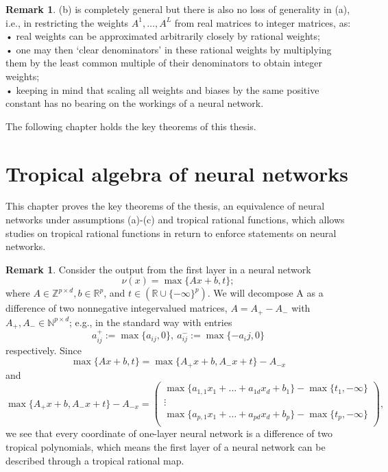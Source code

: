 \documentclass{article}
\theoremstyle{definition}
\newtheorem{remark}[theorem]{Remark}
\begin{document}
\begin{remark}\cite{zhang2018tropical}
(b) is completely general but there is also no loss of generality in (a), i.e., in restricting the weights $A^{1}, \dots ,A^{L}$
from real matrices to integer matrices, as: \\
• real weights can be approximated arbitrarily closely by
rational weights; \\
• one may then ‘clear denominators’ in these rational
weights by multiplying them by the least common multiple of their denominators to obtain integer weights; \\
• keeping in mind that scaling all weights and biases
by the same positive constant has no bearing on the
workings of a neural network.
\end{remark}

The following chapter holds the key theorems of this thesis.

\newpage

\section{Tropical algebra of neural networks}\label{sec:trop_netw}

This chapter proves the key theorems of the thesis, an equivalence of neural networks under assumptions (a)-(c) and tropical rational functions, which allows studies on tropical rational functions in return to enforce statements on neural networks.

\begin{remark}\cite{zhang2018tropical}
\label{com:trop_char_ind_beg}
Consider the output from the first layer in a neural network
$$ \nu(x) = \max \{ Ax+b, t \}; $$
where $A \in \mathbb{Z}^{p \times d}, b \in \mathbb{R}^{p}$, and $t \in (\mathbb{R} \cup \{ - \infty \}^{p})$. We will
decompose A as a difference of two nonnegative integervalued matrices, $A = A_{+} - A_{-}$ with $A_{+},A_{-} \in \mathbb{N}^{p \times d}$; e.g., in the standard way with entries
$$ a^{+}_{ij} := \max \{ a_{ij}, 0 \}, \ a^{-}_{ij} := \max \{ -a_ij , 0\} $$
respectively. Since
$$ \max \{ Ax + b, t \} = \max \{ A_{+}x+b, A_{-}x+t \} - A_{-x}$$
and
$$\max \{ A_{+}x+b, A_{-}x+t \} - A_{-x} = 
 \begin{pmatrix}
  \max\{a_{1,1}x_{1} + \dots + a_{1d}x_{d} + b_1\} - \max\{t_{1},-\infty\}  \\
  \vdots \\
  \max\{a_{p,1}x_{1} + \dots + a_{pd}x_{d} + b_p\} - \max\{t_{p},-\infty\}  \\ 
 \end{pmatrix},$$
we see that every coordinate of one-layer neural network
is a difference of two tropical polynomials, which means the first layer of a neural network can be described through a tropical rational map.
\end{remark}
\end{document}
